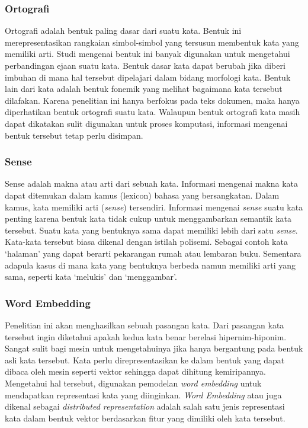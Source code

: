 \subsubsection{Ortografi}
Ortografi adalah bentuk paling dasar dari suatu kata. Bentuk ini merepresentasikan rangkaian simbol-simbol yang tersusun membentuk kata yang memiliki arti. Studi mengenai bentuk ini banyak digunakan untuk mengetahui perbandingan ejaan suatu kata. Bentuk dasar kata dapat berubah jika diberi imbuhan di mana hal tersebut dipelajari dalam bidang morfologi kata. Bentuk lain dari kata adalah bentuk fonemik yang melihat bagaimana kata tersebut dilafakan. Karena penelitian ini hanya berfokus pada teks dokumen, maka hanya diperhatikan bentuk ortografi suatu kata. Walaupun bentuk ortografi kata masih dapat dikatakan sulit digunakan untuk proses komputasi, informasi mengenai bentuk tersebut tetap perlu disimpan.

\subsubsection{Sense}
Sense adalah makna atau arti dari sebuah kata. Informasi mengenai makna kata dapat ditemukan dalam kamus (lexicon) bahasa yang bersangkatan. Dalam kamus, kata memiliki arti (\textit{sense}) tersendiri. Informasi mengenai \textit{sense} suatu kata penting karena bentuk kata tidak cukup untuk menggambarkan semantik kata tersebut. Suatu kata yang bentuknya sama dapat memiliki lebih dari satu \textit{sense}. Kata-kata tersebut biasa dikenal dengan istilah polisemi. Sebagai contoh kata `halaman' yang dapat berarti pekarangan rumah atau lembaran buku. Sementara adapula kasus di mana kata yang bentuknya berbeda namun memiliki arti yang sama, seperti kata `melukis' dan `menggambar'.

\subsubsection{Word Embedding}
Penelitian ini akan menghasilkan sebuah pasangan kata. Dari pasangan kata tersebut ingin diketahui apakah kedua kata benar berelasi hipernim-hiponim. Sangat sulit bagi mesin untuk mengetahuinya jika hanya bergantung pada bentuk asli kata tersebut. Kata perlu direpresentasikan ke dalam bentuk yang dapat dibaca oleh mesin seperti vektor sehingga dapat dihitung kemiripannya. Mengetahui hal tersebut, digunakan pemodelan \textit{word embedding} untuk mendapatkan representasi kata yang diinginkan. \textit{Word Embedding} atau juga dikenal sebagai \textit{distributed representation} adalah salah satu jenis representasi kata dalam bentuk vektor berdasarkan fitur yang dimiliki oleh kata tersebut. 

